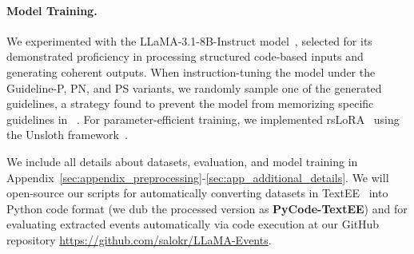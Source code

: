 \paragraph{Model Training.} We experimented with the {LLaMA-3.1-8B-Instruct} model~\cite{grattafiori2024llama3herdmodels}, selected for its demonstrated proficiency in processing structured code-based inputs and generating coherent outputs. When instruction-tuning the model under the Guideline-P, PN, and PS variants, we randomly sample one of the generated guidelines, a strategy found to prevent the model from memorizing specific guidelines in ~\citet{sainz2024gollie}.
For parameter-efficient training, we implemented rsLoRA~\cite{kalajdzievski2023rankstabilizationscalingfactor} using the Unsloth framework~\cite{unsloth}. 

We include all details about datasets, evaluation, and model training in Appendix~\ref{sec:appendix_preprocessing}-\ref{sec:app_additional_details}. {We will open-source our scripts for automatically converting datasets in TextEE~\cite{huang2024textee} into Python code format (we dub the processed version as \textbf{PyCode-TextEE}) and for evaluating extracted events automatically via code execution at our GitHub repository \url{https://github.com/salokr/LLaMA-Events}.}
